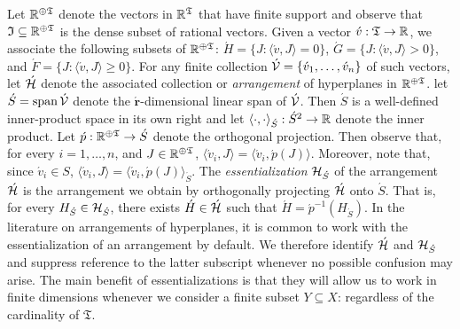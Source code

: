 \documentclass[12pt,a4paper,twoside]{article}
\newcommand{\spann}{\operatorname{span}}
\newcommand{\mbbtpp}{{\mathfrak{T}}}
\newcommand{\mbbjpp}{\mathfrak I}
\begin{document}
\begin{appendices}
Let $\R^{\oplus\mbbtpp}$ denote the vectors in $\R^{\mbbtpp}$ that have finite
support and observe that $\mbbjpp \subseteq \R^{\oplus\mbbtpp}$ is the dense
subset of rational vectors.  Given a vector $\acute{v}: \mbbtpp \rightarrow
\R$, we associate the following subsets of $\R^{\oplus\mbbtpp}$: $\acute H =
\{J : \langle \acute v , J \rangle = 0 \}$, $\acute G = \{J : \langle \acute v,
J \rangle > 0\}$, and $\acute F = \{J : \langle \acute v, J \rangle \geq 0\}$.
For any finite collection $\acute{\mathcal V} = \{\acute{v}_1, \dots, \acute{v}_n\}$
of such vectors, let $\acute{\mathcal H}$ denote the associated collection or
\emph{arrangement} of hyperplanes in $\R^{\oplus\mbbtpp}$. let $\acute{S} =
\spann \acute{\mc V}$ denote the $\acute{\mathbf{r}}$-dimensional linear span
of $\acute{\mathcal V}$. Then $\acute S$ is a well-defined inner-product space in
its own right and let $\langle \cdot , \cdot \rangle_{\acute{S}}: \acute{S}^2
\rightarrow \mathbb R$ denote the inner product. Let $\acute{p}: \R^{\oplus\mbbtpp}
\rightarrow \acute{S}$ denote the orthogonal projection. Then observe that, for
every $i = 1, \dots, n$, and $J \in \R^{\oplus\mbbtpp}$, $\langle \acute{v}_i,
J \rangle = \langle \acute{v}_i, \acute{p}(J)\rangle$.  Moreover, note that,
since $\acute{v}_i \in S$, $\langle \acute{v}_i, J \rangle = \langle
\acute{v}_i, \acute{p}(J) \rangle_{\acute{S}}$.  The \emph{essentialization}
${\mathcal H}_{\acute{S}}$ of the arrangement $\acute{\mathcal H}$ is the arrangement we
obtain by orthogonally projecting $\acute{\mathcal H}$ onto $\acute{S}$.  That is,
for every $H_{\acute{S}} \in {\mathcal H}_{\acute{S}}$, there exists $\acute{H} \in
\acute{\mathcal H}$ such that $\acute{H} = \acute{p}^{-1}(H_{\acute{S}})$.  In the
literature on arrangements of hyperplanes, it is common to work with the
essentialization of an arrangement by default.  We therefore identify
$\acute{\mathcal H}$ and $\mathcal{H}_{\acute{S}}$ and suppress reference to the latter
subscript whenever no possible confusion may arise. The main benefit of
essentializations is that they will allow us to work in finite dimensions
whenever we consider a finite subset $Y\subseteq X$: regardless of the
cardinality of $\mbbtpp$.


\end{appendices}
\end{document}
